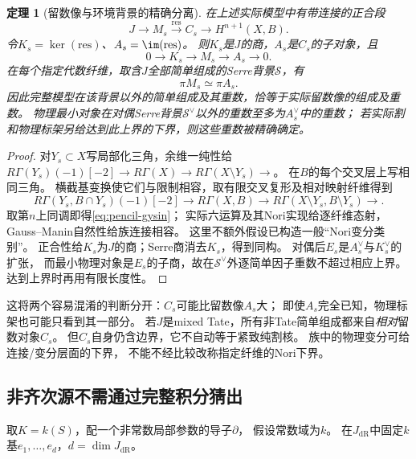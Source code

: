 \documentclass[11pt,a4paper]{ctexart}
\theoremstyle{cnplain}\newtheorem{theorem}{定理}[section]
\theoremstyle{definition}\newtheorem{definition}[theorem]{定义}
\theoremstyle{remark}\newtheorem{remark}[theorem]{注}
\newcommand{\cS}{\mathcal S}\newcommand{\dR}{\mathrm{dR}}
\begin{document}
\begin{theorem}[留数像与环境背景的精确分离]\label{thm:pencil-separation}
在上述实际模型中有带连接的正合段
\begin{equation}\label{eq:pencil-gysin}
 J\longrightarrow M_s\xrightarrow{\mathrm{res}}C_s
       \longrightarrow H^{n+1}(X,B).
\end{equation}
令$K_s=\ker(\mathrm{res})$、$A_s=\im(\mathrm{res})$。
则$K_s$是$J$的商，$A_s$是$C_s$的子对象，且
\[
 0\longrightarrow K_s\longrightarrow M_s\longrightarrow A_s
 \longrightarrow0.
\]
在每个指定代数纤维，取含$J$全部简单组成的Serre背景$\cS$，有
\[
 \pi M_s\simeq\pi A_s.
\]
因此完整模型在该背景以外的简单组成及其重数，恰等于实际留数像的组成及重数。
物理最小对象在对偶Serre背景$\cS^\vee$以外的重数至多为$A_s^\vee$中的重数；
若实际割和物理标架另给达到此上界的下界，则这些重数被精确确定。
\end{theorem}
\begin{proof}
对$Y_s\subset X$写局部化三角，余维一纯性给
$R\Gamma(Y_s)(-1)[-2]\to R\Gamma(X)\to
R\Gamma(X\setminus Y_s)\to$。
在$B$的每个交叉层上写相同三角。
横截基变换使它们与限制相容，取有限交叉复形及相对映射纤维得到
\[
 R\Gamma(Y_s,B\cap Y_s)(-1)[-2]\longrightarrow
 R\Gamma(X,B)\longrightarrow
 R\Gamma(X\setminus Y_s,B\setminus Y_s)\longrightarrow.
\]
取第$n$上同调即得\eqref{eq:pencil-gysin}；
实际六运算及其Nori实现给逐纤维态射，Gauss--Manin自然性给族连接相容。
这里不额外假设已构造一般“Nori变分类别”。
正合性给$K_s$为$J$的商；Serre商消去$K_s$，得到同构。
对偶后$E_s$是$A_s^\vee$与$K_s^\vee$的扩张，
而最小物理对象是$E_s$的子商，故在$\cS^\vee$外逐简单因子重数不超过相应上界。
达到上界时再用有限长度性。
\end{proof}

这将两个容易混淆的判断分开：$C_s$可能比留数像$A_s$大；
即使$A_s$完全已知，物理标架也可能只看到其一部分。
若$J$是mixed Tate，所有非Tate简单组成都来自\emph{相对}留数对象$C_s$。
但$C_s$自身仍含边界，它不自动等于紧致纯割核。
族中的物理变分可给连接/变分层面的下界，
不能不经比较改称指定纤维的Nori下界。

\subsection{非齐次源不需通过完整积分猜出}
取$K=k(S)$，配一个非常数局部参数的导子$\partial$，
假设常数域为$k$。
在$J_{\dR}$中固定$k$基$e_1,\ldots,e_d$，$d=\dim J_{\dR}$。
\end{document}
